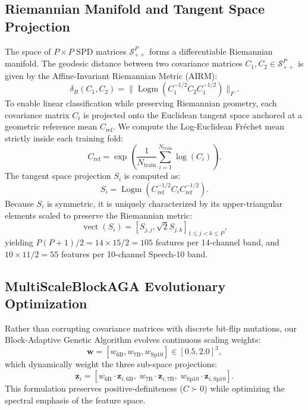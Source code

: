 \documentclass[10pt,twocolumn,a4paper]{article}
\begin{document}
\subsection{Riemannian Manifold and Tangent Space Projection}
The space of $P \times P$ SPD matrices $\mathcal{S}_{++}^P$ forms a differentiable Riemannian manifold. The geodesic distance between two covariance matrices $C_1, C_2 \in \mathcal{S}_{++}^P$ is given by the Affine-Invariant Riemannian Metric (AIRM):
\begin{equation}
\delta_R(C_1, C_2) = \|\operatorname{Logm}(C_1^{-1/2} C_2 C_1^{-1/2})\|_F.
\label{eq:airm}
\end{equation}
To enable linear classification while preserving Riemannian geometry, each covariance matrix $C_i$ is projected onto the Euclidean tangent space anchored at a geometric reference mean $C_{\text{ref}}$. We compute the Log-Euclidean Fr\'echet mean strictly inside each training fold:
\begin{equation}
C_{\text{ref}} = \exp\left( \frac{1}{N_{\text{train}}} \sum_{i=1}^{N_{\text{train}}} \log(C_i) \right).
\label{eq:frechet}
\end{equation}
The tangent space projection $S_i$ is computed as:
\begin{equation}
S_i = \operatorname{Logm}(C_{\text{ref}}^{-1/2} C_i C_{\text{ref}}^{-1/2}).
\label{eq:tangent}
\end{equation}
Because $S_i$ is symmetric, it is uniquely characterized by its upper-triangular elements scaled to preserve the Riemannian metric:
\begin{equation}
\operatorname{vect}(S_i) = \left[ S_{j,j}, \sqrt{2} S_{j,k} \right]_{1 \le j < k \le P},
\label{eq:vect}
\end{equation}
yielding $P(P+1)/2 = 14 \times 15 / 2 = 105$ features per 14-channel band, and $10 \times 11 / 2 = 55$ features per 10-channel Speech-10 band.

\subsection{MultiScaleBlockAGA Evolutionary Optimization}
Rather than corrupting covariance matrices with discrete bit-flip mutations, our Block-Adaptive Genetic Algorithm evolves continuous scaling weights:
\begin{equation}
\mathbf{w} = [w_{\text{6B}}, w_{\text{7B}}, w_{\text{Sp10}}] \in [0.5, 2.0]^3,
\label{eq:w_vector}
\end{equation}
which dynamically weight the three sub-space projections:
\begin{equation}
\mathbf{z}_i = \left[ w_{\text{6B}} \cdot \mathbf{z}_{i,\text{6B}}, \; w_{\text{7B}} \cdot \mathbf{z}_{i,\text{7B}}, \; w_{\text{Sp10}} \cdot \mathbf{z}_{i,\text{Sp10}} \right].
\label{eq:weighted_feat}
\end{equation}
This formulation preserves positive-definiteness ($C \succ 0$) while optimizing the spectral emphasis of the feature space.
\end{document}
